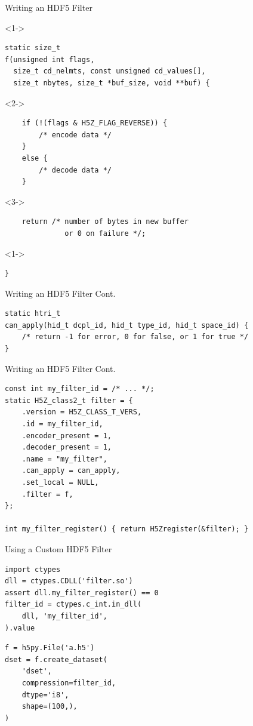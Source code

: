 \documentclass{beamer}
\begin{document}
\begin{frame}[fragile]{Writing an HDF5 Filter}
  \begin{onslide}<1->
    \begin{verbatim}
static size_t
f(unsigned int flags,
  size_t cd_nelmts, const unsigned cd_values[],
  size_t nbytes, size_t *buf_size, void **buf) {
    \end{verbatim}
  \end{onslide}
  \begin{onslide}<2->
    \begin{verbatim}
    if (!(flags & H5Z_FLAG_REVERSE)) {
        /* encode data */
    }
    else {
        /* decode data */
    }
      \end{verbatim}
  \end{onslide}
  \begin{onslide}<3->
      \begin{verbatim}
    return /* number of bytes in new buffer
              or 0 on failure */;
    \end{verbatim}
  \end{onslide}
  \begin{onslide}<1->
    \begin{verbatim}
}
    \end{verbatim}
  \end{onslide}  
\end{frame}

\begin{frame}[fragile]{Writing an HDF5 Filter Cont.}
  \begin{verbatim}
static htri_t
can_apply(hid_t dcpl_id, hid_t type_id, hid_t space_id) {
    /* return -1 for error, 0 for false, or 1 for true */
}
  \end{verbatim}
\end{frame}

\begin{frame}[fragile]{Writing an HDF5 Filter Cont.}
  \begin{verbatim}
const int my_filter_id = /* ... */;
static H5Z_class2_t filter = {
    .version = H5Z_CLASS_T_VERS,
    .id = my_filter_id,
    .encoder_present = 1,
    .decoder_present = 1,
    .name = "my_filter",
    .can_apply = can_apply,
    .set_local = NULL,
    .filter = f,
};

int my_filter_register() { return H5Zregister(&filter); }
  \end{verbatim}
\end{frame}

\begin{frame}[fragile]{Using a Custom HDF5 Filter}
\begin{verbatim}
import ctypes
dll = ctypes.CDLL('filter.so')
assert dll.my_filter_register() == 0
filter_id = ctypes.c_int.in_dll(
    dll, 'my_filter_id',
).value
  \end{verbatim}
  \pause

  \begin{verbatim}
f = h5py.File('a.h5')
dset = f.create_dataset(
    'dset',
    compression=filter_id,
    dtype='i8',
    shape=(100,),
)
  \end{verbatim}
\end{frame}
\end{document}
